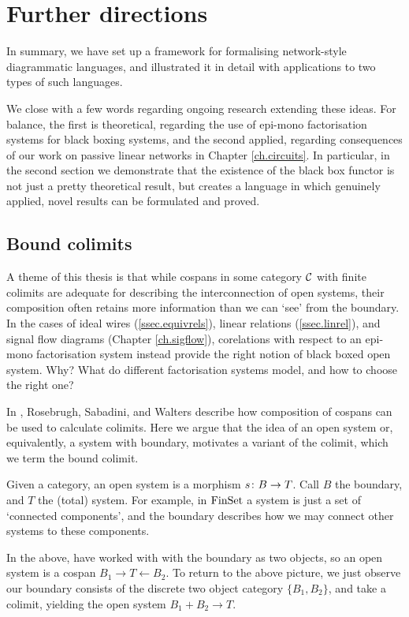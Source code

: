 \chapter{Further directions} \label{ch.further}
In summary, we have set up a framework for formalising network-style
diagrammatic languages, and illustrated it in detail with applications to two
types of such languages.

We close with a few words regarding ongoing research extending these ideas. For
balance, the first is theoretical, regarding the use of epi-mono factorisation
systems for black boxing systems, and the second applied, regarding consequences
of our work on passive linear networks in Chapter \ref{ch.circuits}. In
particular, in the second section we demonstrate that the existence of the black
box functor is not just a pretty theoretical result, but creates a language in
which genuinely applied, novel results can be formulated and proved.

\section{Bound colimits}

A theme of this thesis is that while cospans in some category $\mathcal C$ with
finite colimits are adequate for describing the interconnection of open systems,
their composition often retains more information than we can `see' from the
boundary. In the cases of ideal wires (\textsection\ref{ssec.equivrels}), linear
relations (\textsection\ref{ssec.linrel}), and signal flow diagrams (Chapter
\ref{ch.sigflow}), corelations with respect to an epi-mono factorisation system
instead provide the right notion of black boxed open system. Why? What do
different factorisation systems model, and how to choose the right one?

In \cite{RSW08}, Rosebrugh, Sabadini, and Walters describe how composition of
cospans can be used to calculate colimits. Here we argue that the idea of an
open system or, equivalently, a system with boundary, motivates a variant of
the colimit, which we term the bound colimit.

Given a category, an open system is a morphism $s{\colon} B \to T$. Call $B$ the
boundary, and $T$ the (total) system. For example, in $\mathrm{FinSet}$ a system is just
a set of `connected components', and the boundary describes how we may connect
other systems to these components.

In the above, have worked with with the boundary as two objects, so an open
system is a cospan $B_1 \to T \leftarrow B_2$. To return to the above picture,
we just observe our boundary consists of the discrete two object category
$\{B_1,B_2\}$, and take a colimit, yielding the open system $B_1+B_2 \to T$.

